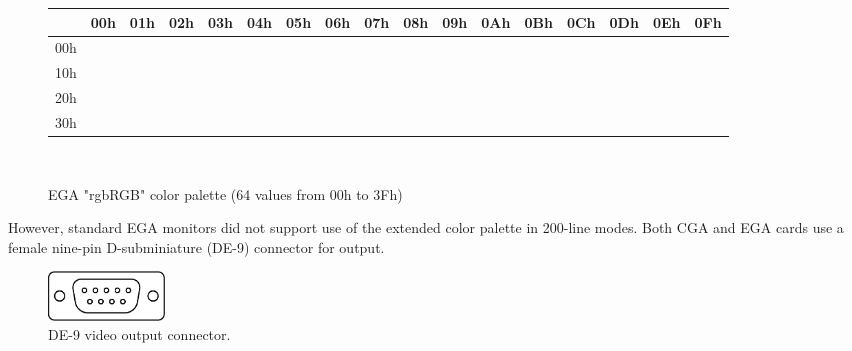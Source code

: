 \documentclass[book.tex]{subfiles}
\begin{document}
\begin{figure}[H]
\centering
\setlength{\tabcolsep}{2.8pt} %
\begin{tabular}{|c|c|c|c|c|c|c|c|c|c|c|c|c|c|c|c|c|}
\hline 
 & 00h & 01h & 02h & 03h & 04h & 05h & 06h & 07h & 08h & 09h & 0Ah & 0Bh & 0Ch & 0Dh & 0Eh & 0Fh \\ \hline
 00h & \cellcolor{CGA_Black} & \cellcolor{CGA_Blue} & \cellcolor{CGA_Green} & \cellcolor{CGA_Cyan} & \cellcolor{CGA_Red} & \cellcolor{CGA_Magenta} & \cellcolor{EGA_06} & \cellcolor{CGA_Light_Grey} & \cellcolor{EGA_08} & \cellcolor{EGA_09} & \cellcolor{EGA_0A} & \cellcolor{EGA_0B} & \cellcolor{EGA_0C} & \cellcolor{EGA_0D} & \cellcolor{EGA_0E} & \cellcolor{EGA_0F} \\ \hline

10h & \cellcolor{EGA_10} & \cellcolor{EGA_11} & \cellcolor{EGA_12} & \cellcolor{EGA_13} & \cellcolor{CGA_Brown} & \cellcolor{EGA_15} & \cellcolor{EGA_16} & \cellcolor{EGA_17} & \cellcolor{EGA_18} & \cellcolor{EGA_19} & \cellcolor{EGA_1A} & \cellcolor{EGA_1B} & \cellcolor{EGA_1C} & \cellcolor{EGA_1D} & \cellcolor{EGA_1E} & \cellcolor{EGA_1F} \\ \hline

20h & \cellcolor{EGA_20} & \cellcolor{EGA_21} & \cellcolor{EGA_22} & \cellcolor{EGA_23} & \cellcolor{EGA_24} & \cellcolor{EGA_25} & \cellcolor{EGA_26} & \cellcolor{EGA_27} & \cellcolor{EGA_28} & \cellcolor{EGA_29} & \cellcolor{EGA_2A} & \cellcolor{EGA_2B} & \cellcolor{EGA_2C} & \cellcolor{EGA_2D} & \cellcolor{EGA_2E} & \cellcolor{EGA_2F} \\ \hline

30h & \cellcolor{EGA_30} & \cellcolor{EGA_31} & \cellcolor{EGA_32} & \cellcolor{EGA_33} & \cellcolor{EGA_34} & \cellcolor{EGA_35} & \cellcolor{EGA_36} & \cellcolor{EGA_37} & \cellcolor{CGA_Dark_Grey} & \cellcolor{CGA_Bright_Blue} & \cellcolor{CGA_Bright_Green} & \cellcolor{CGA_Bright_Cyan} & \cellcolor{CGA_Bright_Red} & \cellcolor{CGA_Bright_Magenta} & \cellcolor{CGA_Bright_Brown} & \cellcolor{CGA_White} \\ \hline


\end{tabular}\\
\setlength{\tabcolsep}{6pt} %
\caption{EGA "rgbRGB" color palette (64 values from 00h to 3Fh)}
\end{figure}

\par
However, standard EGA monitors did not support use of the extended color palette in 200-line modes. Both CGA and EGA cards use a female nine-pin D-subminiature (DE-9) connector for output. \\
 \begin{figure}[H]
\centering
\includegraphics[width=0.15\textwidth]{imgs/drawings/ports/DE9_serial_port.eps}
\caption{DE-9 video output connector.}
\label{fig:serialPort}
\end{figure}
\end{document}
